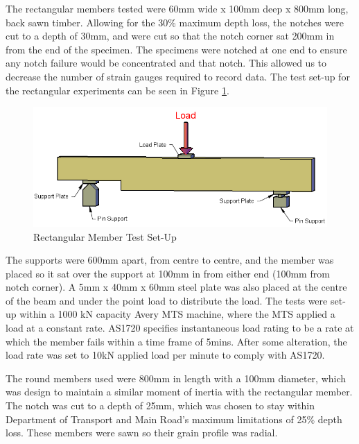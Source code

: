 \documentclass[11pt,a4paper]{article}
\numberwithin{equation}{subsection}
\begin{document}
\vspace*{\baselineskip}

\noindent
The rectangular members tested were 60mm wide x 100mm deep x 800mm long, back sawn timber. Allowing for the 30\% maximum depth loss, the notches were cut to a depth of 30mm, and were cut so that the notch corner sat 200mm in from the end of the specimen.  The specimens were notched at one end to ensure any notch failure would be concentrated and that notch. This allowed us to decrease the number of strain gauges required to record data. The test set-up for the rectangular experiments can be seen in Figure \ref{fig:rect}.

\begin{figure}[h]
	\begin{center}
		\includegraphics[scale=0.55]{Rectangular_Set_up}
	\end{center}
	\caption{Rectangular Member Test Set-Up}
	\label{fig:rect}
\end{figure}

\noindent
The supports were 600mm apart, from centre to centre, and the member was placed so it sat over the support at 100mm in from either end (100mm from notch corner). A 5mm x 40mm x 60mm steel plate was also placed at the centre of the beam and under the point load to distribute the load. The tests were set-up within a 1000 kN capacity Avery MTS machine, where the MTS applied a load at a constant rate. AS1720 specifies instantaneous load rating to be a rate at which the member fails within a time frame of 5mins. After some alteration, the load rate was set to 10kN applied load per minute to comply with AS1720. 


\noindent
The round members used were 800mm in length with a 100mm diameter, which was design to maintain a similar moment of inertia with the rectangular member. The notch was cut to a depth of 25mm, which was chosen to stay within Department of Transport and Main Road's maximum limitations of 25\% depth loss. These members were sawn so their grain profile was radial. 
\end{document}
